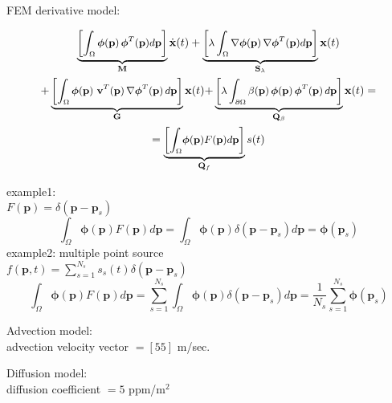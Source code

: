 \documentclass{beamer}
\newcommand{\mb}{\mathbf}
\newcommand{\bs}{\boldsymbol}
\begin{document}
\begin{frame}

FEM derivative model:


\begin{multline} 
\small{\underbrace{\left[ \int_\Omega  
			\bs{\phi}(\mb{p}) \,\bs{\phi}^T(\mb{p}) d\mb{p} 
			\right]}_{\mb{M}} \dot{\mb{x}}(t)  + 
		\underbrace{\left[ \lambda \int_\Omega 
			\nabla	\bs{\phi}(\mb{p}) \,\nabla \bs{\phi}^T(\mb{p}) d\mb{p} 
			\right]}_{\mb{S}_\lambda} \mb{x}(t) }\\
\small{+ \underbrace{\left[ \int_\Omega 
			\bs{\phi}(\mb{p}) ~ \mb{v}^T(\mb{p}) \,\nabla \bs{\phi}^T(\mb{p}) \, d\mb{p} 
			\right]}_{\mb{G}} \mb{x}(t) }
	\small{+ \underbrace{\left[ \lambda \int_{\partial \Omega} 
			\beta(\mb{p}) \, \bs{\phi}(\mb{p}) \,\bs{\phi}^T(\mb{p}) \, d\mb{p}
			\right]}_{\mb{Q}_\beta} \mb{x}(t) = }\\
	=  \small{\underbrace{\left[\displaystyle{\int_\Omega} \bs{\phi}(\mb{p})
			F(\mb{p}) d\mb{p}	\right]}_{\mb{Q}_f} {s}(t) }
\end{multline} 
\end{frame}
\begin{frame}
example1: \\
$F(\mb{p})=\delta(\mb{p}-\mb{p}_s)$\\
$$\int_\Omega \bs{\phi}(\mb{p})
			F(\mb{p}) d\mb{p} = \int_\Omega \bs{\phi}(\mb{p})
			\delta(\mb{p}-\mb{p}_s) d\mb{p}=\bs{\phi}(\mb{p}_s)$$
example2: multiple point source\\
$f(\mb{p},t)=\sum_{s=1}^{N_s} s_s(t) \delta(\mb{p}-\mb{p}_s)$\\
$$\int_\Omega \bs{\phi}(\mb{p})
			F(\mb{p}) d\mb{p} = \sum_{s=1}^{N_s} \int_\Omega \bs{\phi}(\mb{p})
			\delta(\mb{p}-\mb{p}_s) d\mb{p}= \dfrac{1}{N_s} \sum_{s=1}^{N_s} \bs{\phi}(\mb{p}_s)$$
\end{frame}
\begin{frame}
Advection model:\\
advection velocity vector $=[5 5]$ m/sec.
\end{frame}
\begin{frame}
Diffusion model:\\
diffusion coefficient $=5$ ppm/m$^2$
\end{frame}
\end{document}
